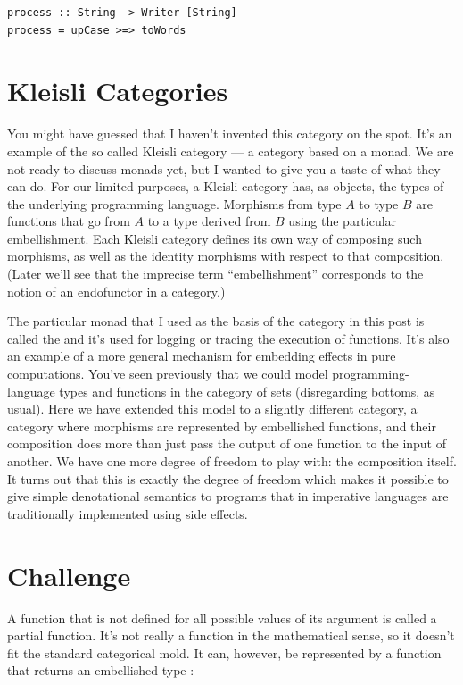 \begin{Verbatim}
process :: String -> Writer [String]
process = upCase >=> toWords
\end{Verbatim}

\section{Kleisli Categories}

You might have guessed that I haven't invented this category on the
spot. It's an example of the so called Kleisli category --- a category
based on a monad. We are not ready to discuss monads yet, but I wanted
to give you a taste of what they can do. For our limited purposes, a
Kleisli category has, as objects, the types of the underlying
programming language. Morphisms from type $A$ to type $B$ are functions that
go from $A$ to a type derived from $B$ using the particular embellishment.
Each Kleisli category defines its own way of composing such morphisms,
as well as the identity morphisms with respect to that composition.
(Later we'll see that the imprecise term ``embellishment'' corresponds
to the notion of an endofunctor in a category.)

The particular monad that I used as the basis of the category in this
post is called the  and it's used for logging or
tracing the execution of functions. It's also an example of a more
general mechanism for embedding effects in pure computations. You've
seen previously that we could model programming-language types and
functions in the category of sets (disregarding bottoms, as usual). Here
we have extended this model to a slightly different category, a category
where morphisms are represented by embellished functions, and their
composition does more than just pass the output of one function to the
input of another. We have one more degree of freedom to play with: the
composition itself. It turns out that this is exactly the degree of
freedom which makes it possible to give simple denotational semantics to
programs that in imperative languages are traditionally implemented
using side effects.

\section{Challenge}

A function that is not defined for all possible values of its argument
is called a partial function. It's not really a function in the
mathematical sense, so it doesn't fit the standard categorical mold. It
can, however, be represented by a function that returns an embellished
type :

